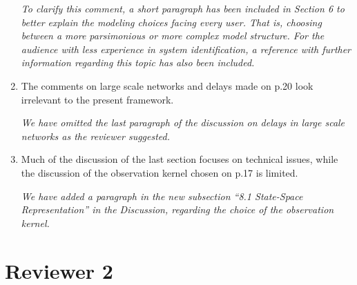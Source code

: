 \documentclass{article}
\newcommand{\parham}[1]{\textcolor{blue}{#1}}
\begin{document}
\begin{enumerate}
				
		\emph{To clarify this comment, a short paragraph has been included in Section 6 to better explain the modeling choices facing every user. That is, choosing between a more parsimonious or more complex model structure.  For the audience with less experience in system identification, a reference with further information regarding this topic has also been included.}
				
		\item The comments on large scale networks and delays made on p.20 look irrelevant to the present framework.
				
		\emph{We have omitted the last paragraph of the discussion on delays in large scale networks as the reviewer suggested.}
				
		\item Much of the discussion of the last section focuses on technical issues, while the discussion of the observation kernel chosen on p.17 is limited.
				
		\emph{We have added a paragraph in the new subsection ``8.1 State-Space Representation'' in the Discussion, regarding the choice of the observation kernel.}

    \end{enumerate}
    
    \section{Reviewer 2}
    
\end{document}
